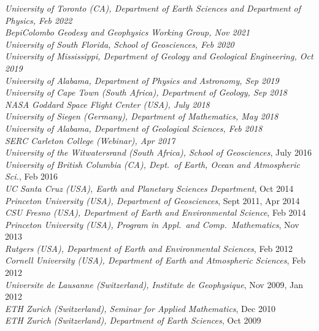 \documentclass[10pt]{article}
\begin{document}
\spcp
\emph{University of Toronto (CA), Department of Earth Sciences and Department of Physics, Feb 2022}\\
\emph{BepiColombo Geodesy and Geophysics Working Group, Nov 2021}\\
\emph{University of South Florida, School of Geosciences, Feb 2020}\\
\emph{University of Mississippi, Department of Geology and Geological Engineering, Oct 2019}\\
\emph{University of Alabama, Department of Physics and Astronomy, Sep 2019}\\
\emph{University of Cape Town (South Africa), Department of Geology, Sep 2018}\\
\emph{NASA Goddard Space Flight Center (USA), July 2018}\\
\emph{University of Siegen (Germany), Department of Mathematics, May 2018}\\
\emph{University of Alabama, Department of Geological Sciences, Feb 2018}\\
\emph{SERC Carleton College (Webinar), Apr 2017}\\
\emph{University of the Witwatersrand (South Africa), School of Geosciences}, July 2016\\
\emph{University of British Columbia (CA), Dept.~of Earth, Ocean and Atmospheric Sci.}, Feb 2016\\
\emph{UC Santa Cruz (USA), Earth and Planetary Sciences Department}, Oct 2014\\
\emph{Princeton University (USA), Department of Geosciences}, Sept  2011, Apr 2014\\
\emph{CSU Fresno (USA), Department of Earth and Environmental Science}, Feb 2014\\
\emph{Princeton University (USA), Program in Appl.~and Comp.~Mathematics}, Nov 2013\\
\emph{Rutgers (USA), Department of Earth and Environmental Sciences}, Feb 2012\\
\emph{Cornell University (USA), Department of Earth and Atmospheric Sciences}, Feb 2012\\
\emph{Universite de Lausanne (Switzerland), Institute de Geophysique}, Nov 2009, Jan 2012\\
\emph{ETH Zurich (Switzerland), Seminar for Applied Mathematics}, Dec 2010\\
\emph{ETH Zurich (Switzerland), Department of Earth Sciences}, Oct 2009



\end{document}
